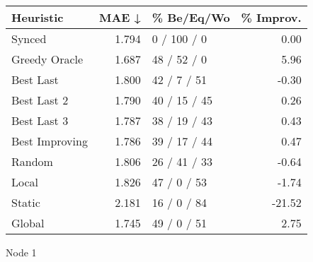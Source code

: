 \begin{tabular}{lrlr}
\toprule
\textbf{Heuristic} & \textbf{MAE ↓} & \textbf{\% Be/Eq/Wo} & \textbf{\% Improv.} \\
\midrule
            Synced &          1.794 &          0 / 100 / 0 &                0.00 \\
     Greedy Oracle &          1.687 &          48 / 52 / 0 &                5.96 \\
         Best Last &          1.800 &          42 / 7 / 51 &               -0.30 \\
       Best Last 2 &          1.790 &         40 / 15 / 45 &                0.26 \\
       Best Last 3 &          1.787 &         38 / 19 / 43 &                0.43 \\
    Best Improving &          1.786 &         39 / 17 / 44 &                0.47 \\
            Random &          1.806 &         26 / 41 / 33 &               -0.64 \\
             Local &          1.826 &          47 / 0 / 53 &               -1.74 \\
            Static &          2.181 &          16 / 0 / 84 &              -21.52 \\
            Global &          1.745 &          49 / 0 / 51 &                2.75 \\
\bottomrule
\end{tabular}
\caption{Node 1}
\label{tab:ds_iid_lr05_le2_bs2_1}
